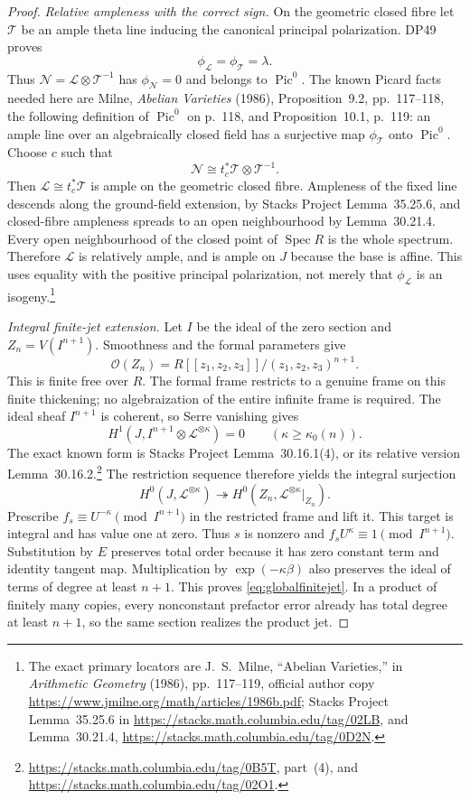 \begin{proof}
\emph{Relative ampleness with the correct sign.}
On the geometric closed fibre let $\mathcal T$ be an ample theta line inducing the canonical principal polarization. DP49 proves
\[
 \phi_{\mathcal L}=\phi_{\mathcal T}=\lambda.
\]
Thus $\mathcal N=\mathcal L\otimes\mathcal T^{-1}$ has
$\phi_{\mathcal N}=0$ and belongs to $\operatorname{Pic}^0$.
The known Picard facts needed here are Milne, \emph{Abelian Varieties} (1986), Proposition~9.2, pp.~117--118, the following definition of $\operatorname{Pic}^0$ on p.~118, and Proposition~10.1, p.~119: an ample line over an algebraically closed field has a surjective map $\phi_{\mathcal T}$ onto $\operatorname{Pic}^0$.
Choose $c$ such that
\[
 \mathcal N\cong t_c^*\mathcal T\otimes\mathcal T^{-1}.
\]
Then $\mathcal L\cong t_c^*\mathcal T$ is ample on the geometric closed fibre.
Ampleness of the fixed line descends along the ground-field extension, by Stacks Project Lemma~35.25.6, and closed-fibre ampleness spreads to an open neighbourhood by Lemma~30.21.4.
Every open neighbourhood of the closed point of $\operatorname{Spec}R$ is the whole spectrum. Therefore $\mathcal L$ is relatively ample, and is ample on $J$ because the base is affine. This uses equality with the positive principal polarization, not merely that $\phi_{\mathcal L}$ is an isogeny.\footnote{The exact primary locators are J.~S.~Milne, ``Abelian Varieties,'' in \emph{Arithmetic Geometry} (1986), pp.~117--119, official author copy \url{https://www.jmilne.org/math/articles/1986b.pdf}; Stacks Project Lemma~35.25.6 in \url{https://stacks.math.columbia.edu/tag/02LB}, and Lemma~30.21.4, \url{https://stacks.math.columbia.edu/tag/0D2N}.}

\emph{Integral finite-jet extension.}
Let $I$ be the ideal of the zero section and $Z_n=V(I^{n+1})$.
Smoothness and the formal parameters give
\[
 \mathcal O(Z_n)
 =R[[z_1,z_2,z_3]]/(z_1,z_2,z_3)^{n+1}.
\]
This is finite free over $R$. The formal frame restricts to a genuine frame on this finite thickening; no algebraization of the entire infinite frame is required.
The ideal sheaf $I^{n+1}$ is coherent, so Serre vanishing gives
\[
 H^1(J,I^{n+1}\otimes\mathcal L^{\otimes\kappa})=0
 \qquad(\kappa\ge\kappa_0(n)).
\]
The exact known form is Stacks Project Lemma~30.16.1(4), or its relative version Lemma~30.16.2.\footnote{\url{https://stacks.math.columbia.edu/tag/0B5T}, part~(4), and \url{https://stacks.math.columbia.edu/tag/02O1}.}
The restriction sequence therefore yields the integral surjection
\[
 H^0(J,\mathcal L^{\otimes\kappa})
 \twoheadrightarrow
 H^0(Z_n,\mathcal L^{\otimes\kappa}|_{Z_n}).
\]
Prescribe $f_s\equiv U^{-\kappa}\pmod{I^{n+1}}$ in the restricted frame and lift it. This target is integral and has value one at zero. Thus $s$ is nonzero and
$f_sU^\kappa\equiv1\pmod{I^{n+1}}$.
Substitution by $E$ preserves total order because it has zero constant term and identity tangent map. Multiplication by $\exp(-\kappa\beta)$ also preserves the ideal of terms of degree at least $n+1$. This proves \eqref{eq:globalfinitejet}.
In a product of finitely many copies, every nonconstant prefactor error already has total degree at least $n+1$, so the same section realizes the product jet.


\end{proof}
